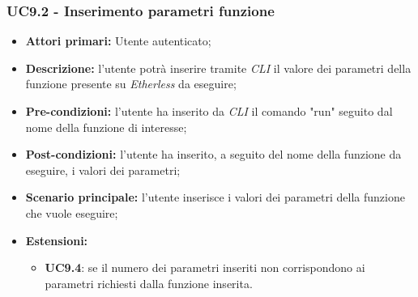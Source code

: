 \subsubsection{UC9.2 - Inserimento parametri funzione}
\begin{itemize}
	\item \textbf{Attori primari:} Utente autenticato;
	\item \textbf{Descrizione:} l'utente potrà inserire tramite \textit{CLI\glo} il valore dei parametri della funzione presente su \textit{Etherless} da eseguire; 
	\item \textbf{Pre-condizioni:} l'utente ha inserito da \textit{CLI\glo} il comando "run" seguito dal nome della funzione di interesse;
	\item \textbf{Post-condizioni:} l'utente ha inserito, a seguito del nome della funzione da eseguire, i valori dei parametri;
	\item \textbf{Scenario principale:} l'utente inserisce i valori dei parametri della funzione che vuole eseguire;
	\item \textbf{Estensioni:} 
	\begin{itemize}
		\item \textbf{UC9.4}: se il numero dei parametri inseriti non corrispondono ai parametri richiesti dalla funzione inserita.
	\end{itemize}
\end{itemize}